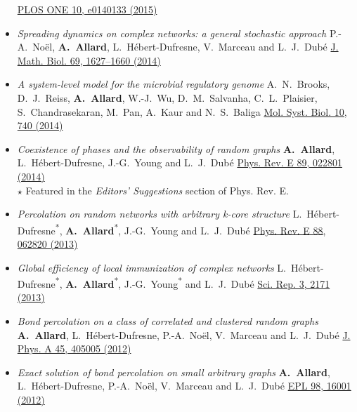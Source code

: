 \documentclass[11pt]{article}
\begin{document}
\begin{itemize}[itemsep=0.5em]
  \href{http://dx.doi.org/10.1371/journal.pone.0140133}{PLOS ONE 10, e0140133 (2015)}
%
  \item \textit{Spreading dynamics on complex networks: a general stochastic approach}\split
  P.-A.~No\"el, \textbf{A.~Allard}, L.~H\'ebert-Dufresne, V.~Marceau and L.~J.~Dub\'e\split
  \href{http://dx.doi.org/10.1007/s00285-013-0744-9}{J. Math. Biol. 69, 1627--1660 (2014)}
%
  \item \textit{A system-level model for the microbial regulatory genome}\split
  A.~N.~Brooks, D.~J.~Reiss, \textbf{A.~Allard}, W.-J.~Wu, D.~M.~Salvanha, C.~L.~Plaisier, S.~Chandrasekaran, M.~Pan, A.~Kaur and N.~S.~Baliga\split
  \href{http://dx.doi.org/10.15252/msb.20145160}{Mol. Syst. Biol. 10, 740 (2014)}
%
  \item \textit{Coexistence of phases and the observability of random graphs}\split
  \textbf{A.~Allard}, L.~H\'ebert-Dufresne, J.-G.~Young and L.~J.~Dub\'e\split
  \href{http://dx.doi.org/10.1103/PhysRevE.89.022801}{Phys. Rev. E 89, 022801 (2014)}\\
  {\footnotesize $\star$ Featured in the \textit{Editors' Suggestions} section of Phys. Rev. E.}
%
  \item\textit{Percolation on random networks with arbitrary k-core structure}\split
  L.~H\'ebert-Dufresne\textsuperscript{*}, \textbf{A.~Allard}\textsuperscript{*}, J.-G.~Young and L.~J.~Dub\'e\split
  \href{http://dx.doi.org/10.1103/PhysRevE.88.062820}{Phys. Rev. E 88, 062820 (2013)}
%
  \item \textit{Global efficiency of local immunization of complex networks}\split
  L.~H\'ebert-Dufresne\textsuperscript{*}, \textbf{A.~Allard}\textsuperscript{*}, J.-G.~Young\textsuperscript{*} and L.~J.~Dub\'e\split
  \href{http://dx.doi.org/10.1038/srep02171}{Sci. Rep. 3, 2171 (2013)}
%
  \item \textit{Bond percolation on a class of correlated and clustered random graphs}\split
  \textbf{A.~Allard}, L.~H\'ebert-Dufresne, P.-A.~No\"el, V.~Marceau and L.~J.~Dub\'e\split
  \href{http://dx.doi.org/10.1088/1751-8113/45/40/405005}{J. Phys. A 45, 405005 (2012)}
%
  \item \textit{Exact solution of bond percolation on small arbitrary graphs}\split
  \textbf{A.~Allard}, L.~H\'ebert-Dufresne, P.-A.~No\"el, V.~Marceau and L.~J.~Dub\'e\split
  \href{http://dx.doi.org/10.1209/0295-5075/98/16001}{EPL 98, 16001 (2012)}

\end{itemize}
\end{document}
